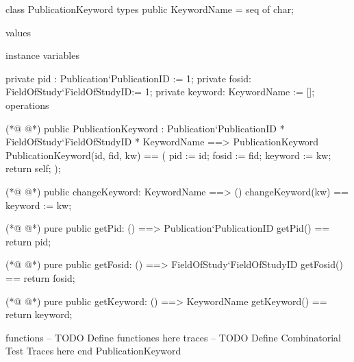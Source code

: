\begin{vdmpp}[breaklines=true]
class PublicationKeyword
types
public KeywordName = seq of char;


values

 
instance variables

 private pid : Publication`PublicationID := 1;
 private fosid: FieldOfStudy`FieldOfStudyID:= 1;
 private keyword: KeywordName := [];
operations

(*@
\label{PublicationKeyword:16}
@*)
public PublicationKeyword : Publication`PublicationID * FieldOfStudy`FieldOfStudyID *
              KeywordName  ==> PublicationKeyword
  PublicationKeyword(id, fid, kw) ==
  (
  pid := id;
  fosid := fid;
  keyword := kw;
  return self;  
  );
  
(*@
\label{changeKeyword:26}
@*)
  public changeKeyword: KeywordName ==> ()
 changeKeyword(kw) ==
 keyword :=  kw;
 
(*@
\label{getPid:30}
@*)
 pure public getPid: () ==> Publication`PublicationID
  getPid() == return pid;
  
(*@
\label{getFosid:33}
@*)
 pure public getFosid: () ==> FieldOfStudy`FieldOfStudyID
  getFosid() == return fosid;
  
(*@
\label{getKeyword:36}
@*)
 pure public getKeyword: () ==> KeywordName
  getKeyword() == return keyword;

functions
-- TODO Define functiones here
traces
-- TODO Define Combinatorial Test Traces here
end PublicationKeyword
\end{vdmpp}
